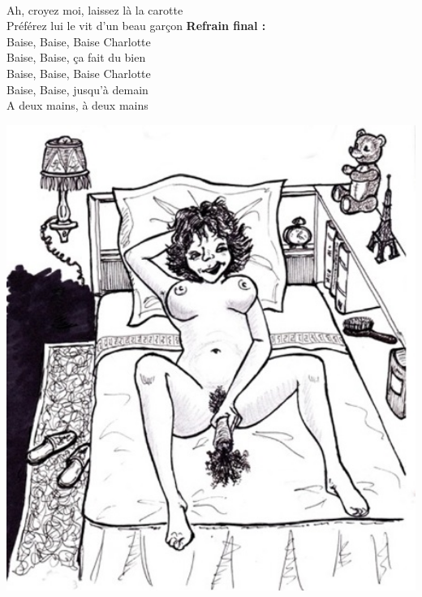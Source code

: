 \\Ah, croyez moi, laissez là la carotte
\\Préférez lui le vit d'un beau garçon
\breakpage
\textbf{Refrain final :}
\\Baise, Baise, Baise Charlotte
\\Baise, Baise, ça fait du bien
\\Baise, Baise, Baise Charlotte
\\Baise, Baise, jusqu'à demain
\\A deux mains, à deux mains
\\
\begin{center}
\includegraphics[width=1\textwidth]{images/charlotte.jpg}
\end{center}

\breakpage